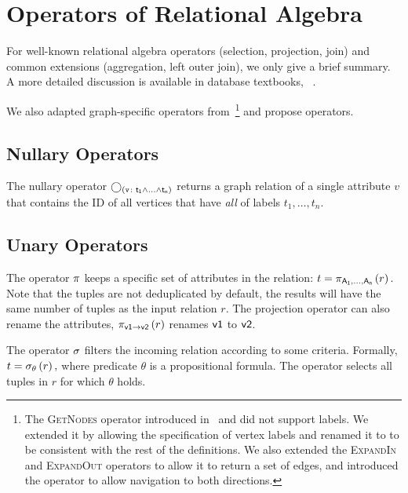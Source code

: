 \section{Operators of Relational Algebra}

For well-known relational algebra operators (\eg selection, projection, join) and common extensions (\eg aggregation, left outer join), we only give a brief summary. A more detailed discussion is available in database textbooks, \eg~\cite{DBLP:books/daglib/0020812, DBLP:books/daglib/0006733}.

We also adapted graph-specific operators from~\cite{DBLP:conf/edbt/HolschG16}\footnote{The \textsc{GetNodes} operator introduced in~\cite{DBLP:conf/edbt/HolschG16} and did not support labels. We extended it by allowing the specification of vertex labels and renamed it to \getverticestext to be consistent with the rest of the definitions. We also extended the \textsc{ExpandIn} and \textsc{ExpandOut} operators to allow it to return a set of edges, and introduced the \expandbothtext operator to allow navigation to both directions.} and propose operators.

\subsection{Nullary Operators}
\label{sec:nullary-operators}

The \getverticestext nullary operator $\getvertices{v}{t_1 \land \ldots \land t_n}$ returns a graph relation of a single attribute $v$ that contains the ID of all vertices that have \emph{all} of labels $t_1, \ldots, t_n$.

\subsection{Unary Operators}
\label{sec:unary-operators}

The \projectiontext operator $\pi$ keeps a specific set of attributes in the relation: $ t = \pi_{\mathsf{A_1, \ldots, A_n}} \left(r\right).$ Note that the tuples are not deduplicated by default, \ie the results will have the same number of tuples as the input relation $r$. The projection operator can also rename the attributes, \eg $\pi_{\mathsf{v1 \rightarrow v2}} \left(r\right)$ renames $\mathsf{v1}$ to $\mathsf{v2}$.

The \selectiontext operator $\sigma$ filters the incoming relation according to some criteria. Formally,
$ t = \sigma_{\mathsf{\theta}} \left(r\right), $
where predicate $\theta$ is a propositional formula. The operator selects all tuples in $r$ for which $\theta$ holds.


